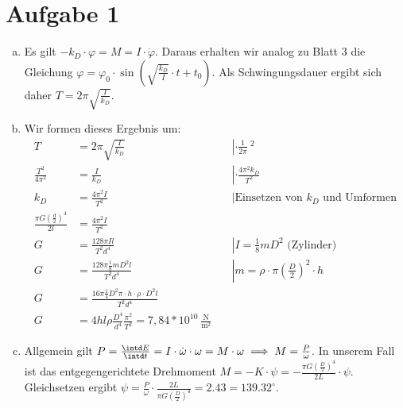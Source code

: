 \documentclass{article}
\begin{document}
\section{Aufgabe 1}
\begin{enumerate}[(a)]
\item Es gilt $-k_D \cdot \varphi = M = I \cdot \ddot{\varphi}$. Daraus erhalten wir analog zu Blatt 3 die Gleichung $\varphi = \varphi_0 \cdot \sin\left(\sqrt{\frac{k_D}{I}} \cdot t + t_0\right)$. Als Schwingungsdauer ergibt sich daher $T = 2\pi \sqrt{\frac{I}{k_D}}$.
\item Wir formen dieses Ergebnis um:
\begin{align*}
T &= 2\pi \sqrt{\frac{I}{k_D}} &&\left| \cdot \frac{1}{2\pi}\right.\ ^2\\
\frac{T^2}{4\pi^2} &= \frac{I}{k_D} &&\left| \cdot \frac{4\pi^2 k_D}{T^2}\right.\\
k_D &= \frac{4\pi^2 I}{T^2}&&\left|\text{Einsetzen von $k_D$ und Umformen}\right.\\
\frac{\pi G \left(\frac{d}{2}\right)^4}{2l} &= \frac{4\pi^2 I}{T^2}\\
G &= \frac{128 \pi Il}{T^2d^4}&&\left|I = \frac{1}{8} m D^2\text{ (Zylinder)}\right.\\
G &= \frac{128 \pi \frac{1}{8} m D^2l}{T^2d^4}&&\left|m = \rho \cdot \pi \left(\frac{D}{2}\right)^2 \cdot h\right.\\
G &= \frac{16 \pi \frac{1}{4} D^2 \pi \cdot h \cdot \rho \cdot D^2l}{T^2d^4}\\
G &= 4 h l\rho \frac{D^4}{d^4} \frac{\pi^2}{T^2} = 7,84 * 10^{10} \frac{\operatorname{N}}{\mathrm{m}^2}
\end{align*}
\item Allgemein gilt $P = \frac{\intd E}{\intd t} = I \cdot \dot\omega \cdot \omega = M \cdot \omega \implies M = \frac{P}{\omega}$. In unserem Fall ist das entgegengerichtete Drehmoment $M = -K \cdot \psi = -\frac{\pi G \left(\frac{D}{2}\right)^4}{2L} \cdot \psi$.
Gleichsetzen ergibt $\psi = \frac{P}{\omega} \cdot \frac{2L}{\pi G \left(\frac{D}{2}\right)^4} = 2.43 = 139.32 ^\circ$.
\end{enumerate}
\end{document}
